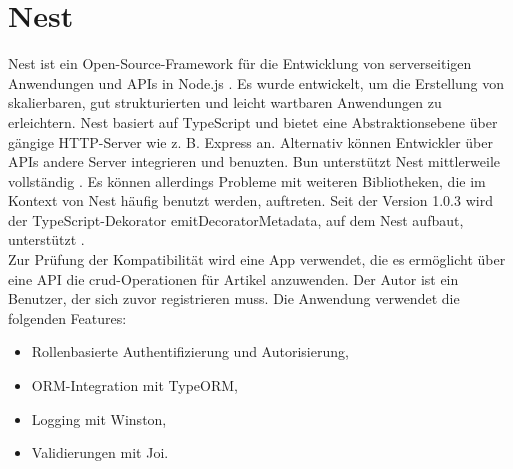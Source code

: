 \section{Nest} \label{sec:compabitility-nest}
Nest ist ein Open-Source-Framework für die Entwicklung von serverseitigen Anwendungen und APIs in Node.js \cite{Mysliwiec.2023}. Es wurde entwickelt, um die Erstellung von skalierbaren, gut strukturierten und leicht wartbaren Anwendungen zu erleichtern. Nest basiert auf TypeScript und bietet eine Abstraktionsebene über gängige HTTP-Server wie z. B. Express an. Alternativ können Entwickler über APIs andere Server integrieren und benuzten. Bun unterstützt Nest mittlerweile vollständig \cite{Sumner.2022b}. Es können allerdings Probleme mit weiteren Bibliotheken, die im Kontext von Nest häufig benutzt werden, auftreten. Seit der Version 1.0.3 wird der TypeScript-Dekorator \glq emitDecoratorMetadata\grq{}, auf dem Nest aufbaut, unterstützt \cite{McDonnel.2023}.\\

\noindent
Zur Prüfung der Kompatibilität wird eine App verwendet, die es ermöglicht über eine API die \ac{crud}-Operationen für Artikel anzuwenden. Der Autor ist ein Benutzer, der sich zuvor registrieren muss. Die Anwendung verwendet die folgenden Features:

\begin{itemize}
	\item Rollenbasierte Authentifizierung und Autorisierung,
	\item ORM-Integration mit TypeORM,
	\item Logging mit Winston,
	\item Validierungen mit Joi.
\end{itemize}

